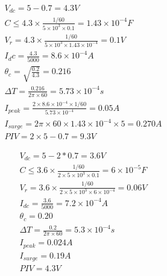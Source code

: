 \documentclass[10pt]{book}
\begin{document}
\begin{mdSnippets}
\begin{mdDisplaySnippet}[d41701556257278a1eecfa5c79ce3e33]%
\[%
\begin{aligned}
  V_{dc} = 5 - 0.7 = 4.3 V \\
  C \leq 4.3\times \frac{1/60}{5\times 10^3 \times 0.1} = 1.43 \times 10^{-4} F \\
  V_r = 4.3 \times \frac{1/60}{5\times 10^3 \times 1.43 \times 10^{-4}} = 0.1 V \\
  I_dc = \frac{4.3}{5000} = 8.6 \times 10^{-4} A \\
  \theta_c = \sqrt{\frac{0.2}{4.3}} = 0.216 \\
  \Delta T = \frac{0.216}{2\pi \times 60} = 5.73 \times 10^{-4} s\\
  I_{peak} = \frac{2 \times 8.6 \times 10^{-4} \times 1 /60}{5.73 \times 10^{-4}} = 0.05 A\\
  I_{surge} = 2\pi \times 60 \times 1.43 \times 10^{-4} \times 5 = 0.270 A \\
  PIV = 2\times 5 - 0.7 = 9.3 V
\end{aligned}
\]%
\end{mdDisplaySnippet}%
\begin{mdDisplaySnippet}%
\[%
\begin{aligned}
  V_{dc} = 5 - 2*0.7 = 3.6 V \\
  C \leq 3.6\times \frac{1/60}{2\times5\times 10^3 \times 0.1} = 6 \times 10^{-5} F \\
  V_r = 3.6 \times \frac{1/60}{2\times 5\times 10^3 \times 6 \times 10^{-4}} = 0.06 V \\
  I_{dc} = \frac{3.6}{5000} = 7.2 \times 10^{-4} A \\
  \theta_c = 0.20 \\
  \Delta T = \frac{0.2}{2\pi \times 60} = 5.3 \times 10^{-4} s\\
  I_{peak} = 0.024 A\\
  I_{surge} = 0.19 A \\
  PIV = 4.3 V
\end{aligned}
\]%
\end{mdDisplaySnippet}%

\end{mdSnippets}
\end{document}
